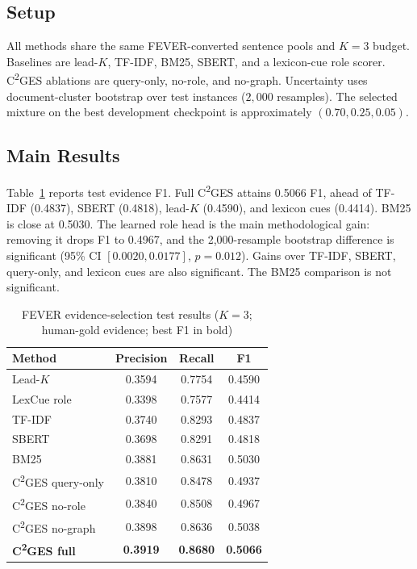 \documentclass[applsci,article,submit,moreauthors]{Definitions/mdpi}
\newcommand{\cges}{C\textsuperscript{2}GES}
\begin{document}
\subsection{Setup}
All methods share the same FEVER-converted sentence pools and $K=3$ budget. Baselines are lead-$K$, TF-IDF, BM25, SBERT, and a lexicon-cue role scorer. \cges{} ablations are query-only, no-role, and no-graph. Uncertainty uses document-cluster bootstrap over test instances ($2{,}000$ resamples). The selected mixture on the best development checkpoint is approximately $(0.70,0.25,0.05)$.

\subsection{Main Results}
Table~\ref{tab:main} reports test evidence F1. Full \cges{} attains 0.5066 F1, ahead of TF-IDF (0.4837), SBERT (0.4818), lead-$K$ (0.4590), and lexicon cues (0.4414). BM25 is close at 0.5030. The learned role head is the main methodological gain: removing it drops F1 to 0.4967, and the 2{,}000-resample bootstrap difference is significant (95\% CI $[0.0020,0.0177]$, $p=0.012$). Gains over TF-IDF, SBERT, query-only, and lexicon cues are also significant. The BM25 comparison is not significant.

\begin{table}[!ht]
\centering
\caption{FEVER evidence-selection test results ($K=3$; human-gold evidence; best F1 in bold)}
\label{tab:main}
\begin{tabular}{lccc}
\toprule
Method & Precision & Recall & F1 \\
\midrule
Lead-$K$ & 0.3594 & 0.7754 & 0.4590 \\
LexCue role & 0.3398 & 0.7577 & 0.4414 \\
TF-IDF & 0.3740 & 0.8293 & 0.4837 \\
SBERT & 0.3698 & 0.8291 & 0.4818 \\
BM25 & 0.3881 & 0.8631 & 0.5030 \\
\cges{} query-only & 0.3810 & 0.8478 & 0.4937 \\
\cges{} no-role & 0.3840 & 0.8508 & 0.4967 \\
\cges{} no-graph & 0.3898 & 0.8636 & 0.5038 \\
\textbf{\cges{} full} & \textbf{0.3919} & \textbf{0.8680} & \textbf{0.5066} \\
\bottomrule
\end{tabular}
\end{table}
\end{document}
